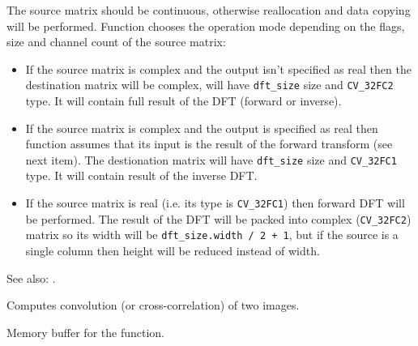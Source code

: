The source matrix should be continuous, otherwise reallocation and data copying will be performed. Function chooses the operation mode depending on the flags, size and channel count of the source matrix:
\begin{itemize}
  \item If the source matrix is complex and the output isn't specified as real then the destination matrix will be complex, will have \texttt{dft\_size} size and \texttt{CV\_32FC2} type. It will contain full result of the DFT (forward or inverse).
  \item If the source matrix is complex and the output is specified as real then function assumes that its input is the result of the forward transform (see next item). The destionation matrix will have \texttt{dft\_size} size and \texttt{CV\_32FC1} type. It will contain result of the inverse DFT.
  \item If the source matrix is real (i.e. its type is \texttt{CV\_32FC1}) then forward DFT will be performed. The result of the DFT will be packed into complex (\texttt{CV\_32FC2}) matrix so its width will be \texttt{dft\_size.width / 2 + 1}, but if the source is a single column then height will be reduced instead of width.
\end{itemize}

See also: .


Computes convolution (or cross-correlation) of two images.


\begin{description}
\end{description}


Memory buffer for the  function.

